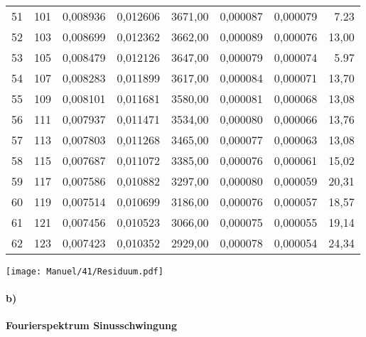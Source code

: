 \begin{center}
\begin{tabular}{l | c | c c r | c c r}
        51 &     101 &   0,008936 &  0,012606 &  3671,00 & 0,000087 &  0,000079 &   7.23 \\
        52 &     103 &   0,008699 &  0,012362 &  3662,00 & 0,000089 &  0,000076 &  13,00 \\
        53 &     105 &   0,008479 &  0,012126 &  3647,00 & 0,000079 &  0,000074 &   5.97 \\
        54 &     107 &   0,008283 &  0,011899 &  3617,00 & 0,000084 &  0,000071 &  13,70 \\
        55 &     109 &   0,008101 &  0,011681 &  3580,00 & 0,000081 &  0,000068 &  13,08 \\
        56 &     111 &   0,007937 &  0,011471 &  3534,00 & 0,000080 &  0,000066 &  13,76 \\
        57 &     113 &   0,007803 &  0,011268 &  3465,00 & 0,000077 &  0,000063 &  13,08 \\
        58 &     115 &   0,007687 &  0,011072 &  3385,00 & 0,000076 &  0,000061 &  15,02 \\
        59 &     117 &   0,007586 &  0,010882 &  3297,00 & 0,000080 &  0,000059 &  20,31 \\
        60 &     119 &   0,007514 &  0,010699 &  3186,00 & 0,000076 &  0,000057 &  18,57 \\
        61 &     121 &   0,007456 &  0,010523 &  3066,00 & 0,000075 &  0,000055 &  19,14 \\
        62 &     123 &   0,007423 &  0,010352 &  2929,00 & 0,000078 &  0,000054 &  24,34 \\
    \end{tabular}  
    \label{tab:fourierkoeff}
\end{center}
\begin{center}
    \texttt{[image: Manuel/41/Residuum.pdf]}
    \label{image:residuum}
\end{center}


\newpage
\paragraph{b)}\textbf{Fourierspektrum Sinusschwingung}

